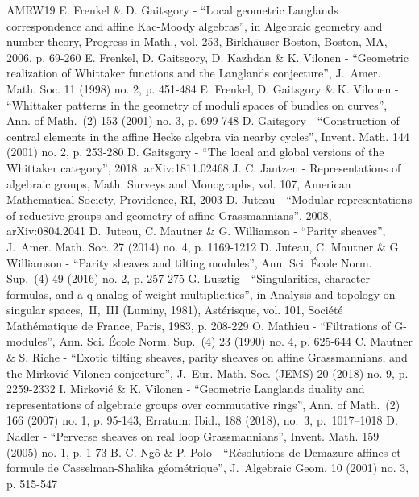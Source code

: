 \documentclass[10pt,a4paper]{amsart}
\theoremstyle{remark}
\numberwithin{equation}{section}
\begin{document}
\begin{thebibliography}{AMRW19}
 E. Frenkel \& D. Gaitsgory - “Local geometric Langlands correspondence and affine Kac-Moody algebras”, in Algebraic geometry and number theory, Progress in Math., vol. 253, Birkhäuser Boston, Boston, MA, 2006, p. 69-260
 E. Frenkel, D. Gaitsgory, D. Kazhdan \& K. Vilonen - “Geometric realization of Whittaker functions and the Langlands conjecture”, J. Amer. Math. Soc. 11 (1998) no. 2, p. 451-484
 E. Frenkel, D. Gaitsgory \& K. Vilonen - “Whittaker patterns in the geometry of moduli spaces of bundles on curves”, Ann. of Math. (2) 153 (2001) no. 3, p. 699-748
 D. Gaitsgory - “Construction of central elements in the affine Hecke algebra via nearby cycles”, Invent. Math. 144 (2001) no. 2, p. 253-280
 D. Gaitsgory - “The local and global versions of the Whittaker category”, 2018, arXiv:1811.02468
 J. C. Jantzen - Representations of algebraic groups, Math. Surveys and Monographs, vol. 107, American Mathematical Society, Providence, RI, 2003
 D. Juteau - “Modular representations of reductive groups and geometry of affine Grassmannians”, 2008, arXiv:0804.2041
 D. Juteau, C. Mautner \& G. Williamson - “Parity sheaves”, J. Amer. Math. Soc. 27 (2014) no. 4, p. 1169-1212
 D. Juteau, C. Mautner \& G. Williamson - “Parity sheaves and tilting modules”, Ann. Sci. École Norm. Sup. (4) 49 (2016) no. 2, p. 257-275
 G. Lusztig - “Singularities, character formulas, and a q-analog of weight multiplicities”, in Analysis and topology on singular spaces, II, III (Luminy, 1981), Astérisque, vol. 101, Société Mathématique de France, Paris, 1983, p. 208-229
 O. Mathieu - “Filtrations of G-modules”, Ann. Sci. École Norm. Sup. (4) 23 (1990) no. 4, p. 625-644
 C. Mautner \& S. Riche - “Exotic tilting sheaves, parity sheaves on affine Grassmannians, and the Mirković-Vilonen conjecture”, J. Eur. Math. Soc. (JEMS) 20 (2018) no. 9, p. 2259-2332
 I. Mirković \& K. Vilonen - “Geometric Langlands duality and representations of algebraic groups over commutative rings”, Ann. of Math. (2) 166 (2007) no. 1, p. 95-143, Erratum: Ibid., 188 (2018), no. 3, p. 1017–1018
 D. Nadler - “Perverse sheaves on real loop Grassmannians”, Invent. Math. 159 (2005) no. 1, p. 1-73
 B. C. Ngô \& P. Polo - “Résolutions de Demazure affines et formule de Casselman-Shalika géométrique”, J. Algebraic Geom. 10 (2001) no. 3, p. 515-547

\end{thebibliography}
\end{document}

